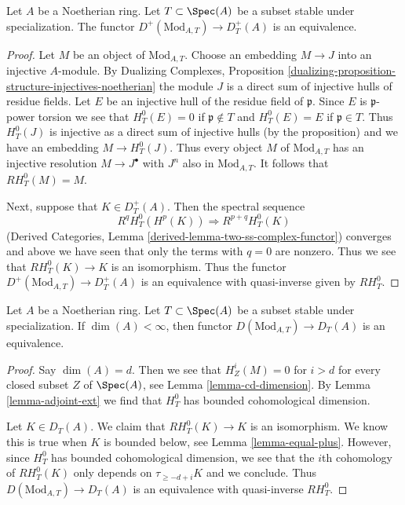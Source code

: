 \begin{lemma}
\label{lemma-equal-plus}
Let $A$ be a Noetherian ring. Let $T \subset \Spec(A)$ be a subset stable
under specialization. The functor $D^+(\text{Mod}_{A, T}) \to D^+_T(A)$
is an equivalence.
\end{lemma}

\begin{proof}
Let $M$ be an object of $\text{Mod}_{A, T}$. Choose an embedding
$M \to J$ into an injective $A$-module. By
Dualizing Complexes, Proposition
\ref{dualizing-proposition-structure-injectives-noetherian}
the module $J$ is a direct sum of injective hulls of residue fields.
Let $E$ be an injective hull of the residue field of $\mathfrak p$.
Since $E$ is $\mathfrak p$-power torsion we see that
$H^0_T(E) = 0$ if $\mathfrak p \not \in T$ and
$H^0_T(E) = E$ if $\mathfrak p \in T$.
Thus $H^0_T(J)$ is injective as a direct sum of injective hulls
(by the proposition) and we have an embedding $M \to H^0_T(J)$.
Thus every object $M$ of $\text{Mod}_{A, T}$ has an injective resolution
$M \to J^\bullet$ with $J^n$ also in $\text{Mod}_{A, T}$. It follows
that $RH^0_T(M) = M$.

\medskip\noindent
Next, suppose that $K \in D_T^+(A)$. Then the spectral sequence
$$
R^qH^0_T(H^p(K)) \Rightarrow R^{p + q}H^0_T(K)
$$
(Derived Categories, Lemma \ref{derived-lemma-two-ss-complex-functor})
converges and above we have seen that only the terms with $q = 0$
are nonzero. Thus we see that $RH^0_T(K) \to K$ is an isomorphism.
Thus the functor $D^+(\text{Mod}_{A, T}) \to D^+_T(A)$
is an equivalence with quasi-inverse given by $RH^0_T$.
\end{proof}

\begin{lemma}
\label{lemma-equal-full}
Let $A$ be a Noetherian ring. Let $T \subset \Spec(A)$ be a subset stable
under specialization. If $\dim(A) < \infty$, then functor
$D(\text{Mod}_{A, T}) \to D_T(A)$ is an equivalence.
\end{lemma}

\begin{proof}
Say $\dim(A) = d$. Then we see that $H^i_Z(M) = 0$ for $i > d$
for every closed subset $Z$ of $\Spec(A)$, see
Lemma \ref{lemma-cd-dimension}.
By Lemma \ref{lemma-adjoint-ext} we find that $H^0_T$ has bounded
cohomological dimension.

\medskip\noindent
Let $K \in D_T(A)$. We claim that $RH^0_T(K) \to K$ is an
isomorphism. We know this is true when $K$ is bounded below, see
Lemma \ref{lemma-equal-plus}. However, since $H^0_T$ has bounded
cohomological dimension, we see that the $i$th cohomology of
$RH_T^0(K)$ only depends on $\tau_{\geq -d + i}K$ and we conclude.
Thus $D(\text{Mod}_{A, T}) \to D_T(A)$ is an equivalence with
quasi-inverse $RH^0_T$.
\end{proof}

